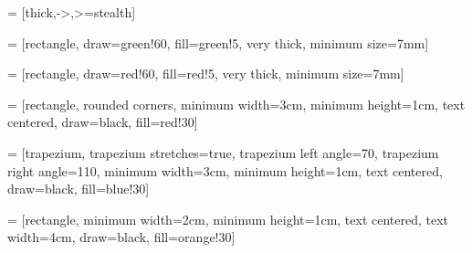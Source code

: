 \usepackage{tikz}
\usetikzlibrary{positioning, tikzmark, calc, shapes.geometric, arrows}  %

\newenvironment{myTree}
{
    \begingroup
    \begin{center}
    \begin{tikzpicture}[level distance=1.5cm, level 1/.style={sibling distance=3cm}, level 2/.style={sibling distance=1.5cm}]
}
{
    \end{tikzpicture}
    \end{center}
    \endgroup
}


\newenvironment{myTreeLThree}
{
    \begingroup
    \begin{center}
    \begin{tikzpicture}[level distance=1.5cm, level 1/.style={sibling distance=6cm}, level 2/.style={sibling distance=3cm}, level 3/.style={sibling distance=1.5cm}]
}
{
    \end{tikzpicture}
    \end{center}
    \endgroup
}

\newenvironment{vArrow}[3][black]
{
    \draw[->, #1] (#2) -- (#3);
}
{

}

\newenvironment{tArcDown}[2][black]
{
    \draw[-latex,#1] ($#2$) arc [ start angle=-160, end angle=-20, x radius=0.9cm, y radius =0.7cm ] ;
}
{

}


\newenvironment{tArcUp}[2][red]
{
    \draw[-latex,#1] ($#2$) arc [ start angle=160, end angle=20, x radius=0.9cm, y radius =0.7cm ] ;
}
{

}

 = [thick,->,>=stealth]

 = [rectangle, draw=green!60, fill=green!5, very thick, minimum size=7mm]

 = [rectangle, draw=red!60, fill=red!5, very thick, minimum size=7mm]

 = [rectangle, rounded corners, minimum width=3cm, minimum height=1cm, text centered, draw=black, fill=red!30]

 = [trapezium, trapezium stretches=true, trapezium left angle=70, trapezium right angle=110, minimum width=3cm, minimum height=1cm, text centered, draw=black, fill=blue!30]

 = [rectangle, minimum width=2cm, minimum height=1cm, text centered, text width=4cm, draw=black, fill=orange!30]


